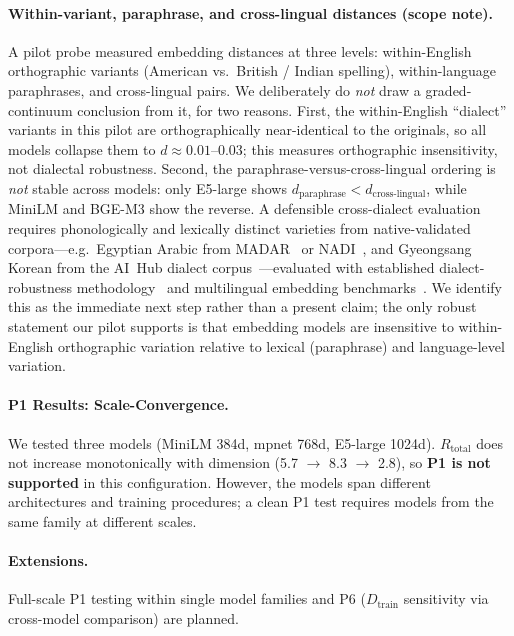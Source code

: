 \documentclass[11pt]{article}
\theoremstyle{definition}
\newcommand{\Dtrain}{D_{\text{train}}}
\begin{document}
\paragraph{Within-variant, paraphrase, and cross-lingual distances (scope note).}
A pilot probe measured embedding distances at three levels: within-English orthographic variants (American vs.\ British / Indian spelling), within-language paraphrases, and cross-lingual pairs. We deliberately do \emph{not} draw a graded-continuum conclusion from it, for two reasons. First, the within-English ``dialect'' variants in this pilot are orthographically near-identical to the originals, so all models collapse them to $d \approx 0.01$--$0.03$; this measures orthographic insensitivity, not dialectal robustness. Second, the paraphrase-versus-cross-lingual ordering is \emph{not} stable across models: only E5-large shows $d_{\text{paraphrase}} < d_{\text{cross-lingual}}$, while MiniLM and BGE-M3 show the reverse. A defensible cross-dialect evaluation requires phonologically and lexically distinct varieties from native-validated corpora---e.g.\ Egyptian Arabic from MADAR~\cite{bouamor2018madar} or NADI~\cite{abdulmageed2024nadi}, and Gyeongsang Korean from the AI~Hub dialect corpus~\cite{aihub2024kodialect}---evaluated with established dialect-robustness methodology~\cite{ziems2022value} and multilingual embedding benchmarks~\cite{enevoldsen2025mmteb}. We identify this as the immediate next step rather than a present claim; the only robust statement our pilot supports is that embedding models are insensitive to within-English orthographic variation relative to lexical (paraphrase) and language-level variation.

\paragraph{P1 Results: Scale-Convergence.}
We tested three models (MiniLM 384d, mpnet 768d, E5-large 1024d). $R_{\text{total}}$ does not increase monotonically with dimension (5.7 $\to$ 8.3 $\to$ 2.8), so \textbf{P1 is not supported} in this configuration. However, the models span different architectures and training procedures; a clean P1 test requires models from the same family at different scales.

\paragraph{Extensions.} Full-scale P1 testing within single model families and P6 ($\Dtrain$ sensitivity via cross-model comparison) are planned.
\end{document}
